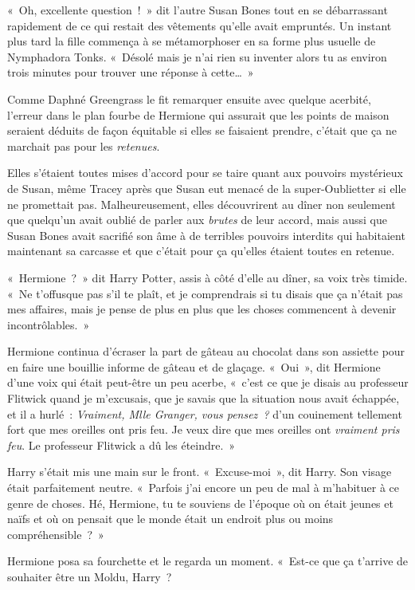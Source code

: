 «~Oh, excellente question~!~»
dit l'autre Susan Bones tout en se débarrassant rapidement de ce qui restait des vêtements qu'elle avait empruntés.
Un instant plus tard la fille commença à se métamorphoser en sa forme plus usuelle de Nymphadora Tonks.
«~Désolé mais je n'ai rien su inventer alors tu as environ trois minutes pour trouver une réponse à cette…~»

\later

Comme Daphné Greengrass le fit remarquer ensuite avec quelque acerbité, l'erreur dans le plan fourbe de Hermione qui assurait que les points de maison seraient déduits de façon équitable si elles se faisaient prendre, c'était que ça ne marchait pas pour les \emph{retenues}.

Elles s'étaient toutes mises d'accord pour se taire quant aux pouvoirs mystérieux de Susan, même Tracey après que Susan eut menacé de la super-Oublietter si elle ne promettait pas.
Malheureusement, elles découvrirent au dîner non seulement que quelqu'un avait oublié de parler aux \emph{brutes} de leur accord, mais aussi que Susan Bones avait sacrifié son âme à de terribles pouvoirs interdits qui habitaient maintenant sa carcasse et que c'était pour ça qu'elles étaient toutes en retenue.

«~Hermione~?~»
dit Harry Potter, assis à côté d'elle au dîner, sa voix très timide.
«~Ne t'offusque pas s'il te plaît, et je comprendrais si tu disais que ça n'était pas mes affaires, mais je pense de plus en plus que les choses commencent à devenir incontrôlables.~»

Hermione continua d'écraser la part de gâteau au chocolat dans son assiette pour en faire une bouillie informe de gâteau et de glaçage.
«~Oui~», dit Hermione d'une voix qui était peut-être un peu acerbe, «~c'est ce que je disais au professeur Flitwick quand je m'excusais, que je savais que la situation nous avait échappée, et il a hurlé~: \emph{Vraiment, Mlle Granger, vous pensez~?} d'un couinement tellement fort que mes oreilles ont pris feu.
Je veux dire que mes oreilles ont \emph{vraiment pris feu}.
Le professeur Flitwick a dû les éteindre.~»

Harry s'était mis une main sur le front.
«~Excuse-moi~», dit Harry.
Son visage était parfaitement neutre.
«~Parfois j'ai encore un peu de mal à m'habituer à ce genre de choses.
Hé, Hermione, tu te souviens de l'époque où on était jeunes et naïfs et où on pensait que le monde était un endroit plus ou moins compréhensible~?~»

Hermione posa sa fourchette et le regarda un moment.
«~Est-ce que ça t'arrive de souhaiter être un Moldu, Harry~?


